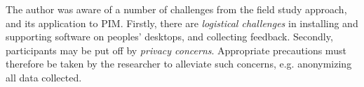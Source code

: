 The author was aware of a number of challenges from the field study approach, and its application to PIM.
Firstly, there are \textit{logistical challenges} in installing and supporting software on peoples' desktops, and collecting feedback. 
Secondly, participants may be put off by \textit{privacy concerns}. Appropriate precautions must therefore be taken by the researcher to alleviate such concerns, e.g. anonymizing all data collected. 
